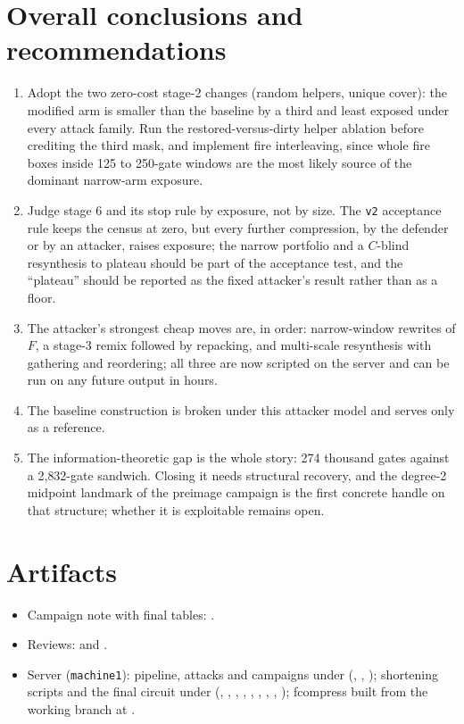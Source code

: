\documentclass[11pt,a4paper]{article}
\newcommand{\code}[1]{\texttt{#1}}
\begin{document}
\section{Overall conclusions and recommendations}
\begin{enumerate}
\item Adopt the two zero-cost stage-2 changes (random helpers, unique cover): the modified arm is smaller than the baseline by a third and least exposed under every attack family. Run the restored-versus-dirty helper ablation before crediting the third mask, and implement fire interleaving, since whole fire boxes inside 125 to 250-gate windows are the most likely source of the dominant narrow-arm exposure.
\item Judge stage 6 and its stop rule by exposure, not by size. The \code{v2} acceptance rule keeps the census at zero, but every further compression, by the defender or by an attacker, raises exposure; the narrow portfolio and a $C$-blind resynthesis to plateau should be part of the acceptance test, and the ``plateau'' should be reported as the fixed attacker's result rather than as a floor.
\item The attacker's strongest cheap moves are, in order: narrow-window rewrites of $F$, a stage-3 remix followed by repacking, and multi-scale resynthesis with gathering and reordering; all three are now scripted on the server and can be run on any future output in hours.
\item The baseline construction is broken under this attacker model and serves only as a reference.
\item The information-theoretic gap is the whole story: 274 thousand gates against a 2{,}832-gate sandwich. Closing it needs structural recovery, and the degree-2 midpoint landmark of the preimage campaign is the first concrete handle on that structure; whether it is exploitable remains open.
\end{enumerate}

\section*{Artifacts}
\begin{itemize}
\item Campaign note with final tables: .
\item Reviews:  and .
\item Server (\code{machine1}): pipeline, attacks and campaigns under  (, , ); shortening scripts and the final circuit under  (, , , , , , , , ); fcompress built from the working branch at .
\end{itemize}
\end{document}
